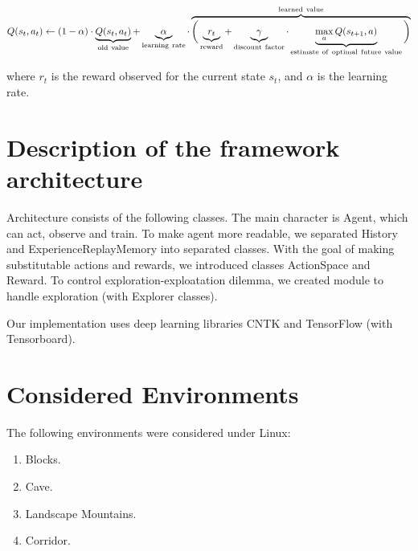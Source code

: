\documentclass{article}
\begin{document}
$$Q(s_{t},a_{t}) \leftarrow (1-\alpha) \cdot
\underbrace{Q(s_{t},a_{t})}_{\rm old~value} +
\underbrace{\alpha}_{\rm learning~rate} \cdot
\overbrace{\bigg( \underbrace{r_{t}}_{\rm reward} +
\underbrace{\gamma}_{\rm discount~factor} \cdot
\underbrace{\max_{a}Q(s_{t+1}, a)}_{\rm
estimate~of~optimal~future~value} \bigg) }^{\rm learned~value} $$

where $r_{t}$ is the reward observed for the current state
$s_t$, and $\alpha$ is the learning rate.


\section{Description of the framework architecture}

Architecture consists of the following classes. The main character is
Agent, which can act, observe and train.
To make agent more readable, we separated History and
ExperienceReplayMemory into separated classes.
With the goal of making substitutable actions and rewards,
we introduced classes ActionSpace and Reward.
To control exploration-exploatation dilemma, we created module to
handle exploration (with Explorer classes).

Our implementation uses deep learning libraries CNTK
and TensorFlow (with Tensorboard).

\section{Considered Environments}

The following environments were considered under Linux:
\begin{enumerate}
    \item Blocks.
    \item Cave.
    \item Landscape Mountains.
    \item Corridor.
\end{enumerate}
\end{document}
